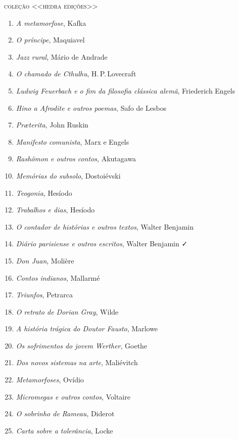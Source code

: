 \pagebreak
\blankpage

\pagestyle{empty}

\begingroup
\fontsize{7}{8}\selectfont
{\large\textsc{coleção <<hedra edições>>}}\\

\begin{enumerate}
\setlength\parskip{4.2pt}
\setlength\itemsep{-1.4mm}
\item \textit{A metamorfose}, Kafka
\item \textit{O príncipe}, Maquiavel
\item \textit{Jazz rural}, Mário de Andrade
\item \textit{O chamado de Cthulhu}, H.\,P.\,Lovecraft
\item \textit{Ludwig Feuerbach e o fim da filosofia clássica alemã}, Friederich Engels
\item \textit{Hino a Afrodite e outros poemas}, Safo de Lesbos 
\item \textit{Pr\ae terita}, John Ruskin
\item \textit{Manifesto comunista}, Marx e Engels
\item \textit{Rashômon e outros contos}, Akutagawa
\item \textit{Memórias do subsolo}, Dostoiévski
\item \textit{Teogonia}, Hesíodo
\item \textit{Trabalhos e dias}, Hesíodo
\item \textit{O contador de histórias e outros textos}, Walter Benjamin
\item \textit{Diário parisiense e outros escritos}, Walter Benjamin ✓
\item \textit{Don Juan}, Molière
\item \textit{Contos indianos}, Mallarmé
\item \textit{Triunfos}, Petrarca
\item \textit{O retrato de Dorian Gray}, Wilde
\item \textit{A história trágica do Doutor Fausto}, Marlowe
\item \textit{Os sofrimentos do jovem Werther}, Goethe
\item \textit{Dos novos sistemas na arte}, Maliévitch
\item \textit{Metamorfoses}, Ovídio
\item \textit{Micromegas e outros contos}, Voltaire
\item \textit{O sobrinho de Rameau}, Diderot
\item \textit{Carta sobre a tolerância}, Locke

\end{enumerate}

